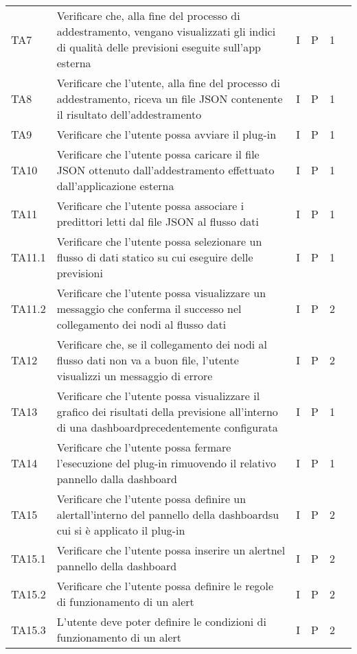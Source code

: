 \begin{longtable} {
	>{}p{12mm}
	>{}p{79.5mm}
	>{}p{9mm}
	>{}p{8mm}
	>{}p{14mm}
	>{}p{0mm}}
	TA7 & Verificare che, alla fine del processo di addestramento, vengano visualizzati gli indici di qualità delle previsioni eseguite sull'app esterna & I & P & 1 & \TBstrut \\ [2mm]
	TA8 & Verificare che l'utente, alla fine del processo di addestramento, riceva un file JSON contenente il risultato dell'addestramento & I & P & 1 & \TBstrut \\ [2mm]
	TA9	& Verificare che l'utente possa avviare il plug-in & I & P & 1 & \TBstrut \\ [2mm]
	TA10 & Verificare che l'utente possa caricare il file JSON ottenuto dall'addestramento effettuato dall'applicazione esterna & I & P & 1 & \TBstrut \\ [2mm]
	TA11 & Verificare che l'utente possa associare i predittori letti dal file JSON al flusso dati & I & P & 1 & \TBstrut \\ [2mm]
	TA11.1 & Verificare che l'utente possa selezionare un flusso di dati statico su cui eseguire delle previsioni & I & P & 1 & \TBstrut \\ [2mm]
	TA11.2 & Verificare che l'utente possa visualizzare un messaggio che conferma il successo nel collegamento dei nodi al flusso dati & I & P & 2 & \TBstrut \\ [2mm]
	TA12 & Verificare che, se il collegamento dei nodi al flusso dati non va a buon file, l'utente visualizzi un messaggio di errore & I & P & 2 & \TBstrut \\ [2mm]
	TA13 & Verificare che l'utente possa visualizzare il grafico dei risultati della previsione all'interno di una dashboard\glosp precedentemente configurata & I & P & 1 & \TBstrut \\ [2mm]
	TA14 & Verificare che l'utente possa fermare l'esecuzione del plug-in rimuovendo il relativo pannello dalla dashboard\glo & I & P & 1 & \TBstrut \\ [2mm]
	TA15 & Verificare che l'utente possa definire un alert\glosp all'interno del pannello della dashboard\glosp su cui si è applicato il plug-in & I & P & 2 & \TBstrut \\ [2mm]
	TA15.1 & Verificare che l'utente possa inserire un alert\glosp nel pannello della dashboard\glo & I & P & 2 & \TBstrut \\ [2mm]
	TA15.2 & Verificare che l'utente possa definire le regole di funzionamento di un alert\glo & I & P & 2 & \TBstrut \\ [2mm]
	TA15.3 & L'utente deve poter definire le condizioni di funzionamento di un alert\glo & I & P & 2 & \TBstrut \\ [2mm]

\end{longtable}
